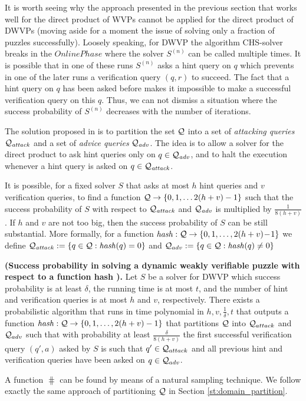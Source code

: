 It is worth seeing why the approach presented in the previous section that works well for the direct product of WVPs
cannot be applied for the direct product of DWVPs (moving aside for a moment the issue of solving only a fraction of puzzles successfully).
Loosely speaking, for DWVP the algorithm CHS-solver breaks in the $\mathit{OnlinePhase}$ where the solver $S^{(n)}$ can be called multiple times.
It is possible that in one of these runs $S^{(n)}$ asks a hint query on $q$
which prevents in one of the later runs a verification query $(q,r)$ to succeed.
The fact that a hint query on $q$ has been asked before makes it impossible to make a successful verification query on this $q$.
Thus, we can not dismiss a situation where the success probability of $S^{(n)}$ decreases with the number of iterations.

The solution proposed in \cite{Dodis:2009:SAI:1530441.1530450} is to partition the set $\mathcal{Q}$ into a set of \textit{attacking queries} $\mathcal{Q}_{\mathit{attack}}$
and a set of \textit{advice queries} $\mathcal{Q}_{\mathit{adv}}$. The idea is to allow a solver for the direct product to ask hint
queries only on $q \in \mathcal{Q}_{\mathit{adv}}$, and to halt the execution whenever a hint query is asked on $q \in \mathcal{Q}_{\mathit{attack}}$.

It is possible, for a fixed solver $S$ that asks at most $h$ hint queries and $v$ verification queries,
to find a function $\mathcal{Q} \rightarrow \{0,1,\dotsc 2(h+v)-1\}$ such that the success probability of $S$ with respect to
$\mathcal{Q}_{\mathit{attack}}$ and $\mathcal{Q}_{\mathit{adv}}$ is multiplied by $\frac{1}{8(h+v)}$.
If $h$ and $v$ are not too big, then the success probability of $S$ can be still substantial.
More formally, for a function $\operatorname{\mathit{hash}}:\mathcal{Q} \rightarrow \{0,1,\dotsc, 2(h+v)\!-\!1 \}$
we define $\mathcal{Q}_{\mathit{attack}} := \{q \in \mathcal{Q} : \operatorname{\mathit{hash}}(q) = 0 \}$ and $\mathcal{Q}_{adv} := \{q \in \mathcal{Q}: \operatorname{\mathit{hash}}(q) \neq 0\}$
\begin{lemma}
\textbf{(Success probability in solving a dynamic weakly verifiable puzzle with respect to a function hash \cite{Dodis:2009:SAI:1530441.1530450}).}
  \label{lemma:hash_function_previous}
Let $S$ be a solver for DWVP which success probability is at least $\delta$, the running time is at most $t$,
and the number of hint and verification queries is at most $h$ and $v$, respectively.
There exists a probabilistic algorithm that runs in time polynomial in $h,v,\frac{1}{\delta},t$
that outputs a function $\operatorname{\mathit{hash}} : \mathcal{Q} \rightarrow \{0,1, \dotsc, 2(h+v)-1\}$
that partitions $\mathcal{Q}$ into $\mathcal{Q}_{attack}$ and $\mathcal{Q}_{adv}$ such that
with probability at least $\frac{\delta}{8(h+v)}$ the first successful verification query $(q',a)$ asked by $S$ is such that $q' \in \mathcal{Q}_{attack}$
and all previous hint and verification queries have been asked on $q \in \mathcal{Q}_{adv}$.
\end{lemma}
A function $\hash$ can be found by means of a natural sampling technique.
We follow exactly the same approach of partitioning $\mathcal{Q}$ in Section \ref{st:domain_partition}.


